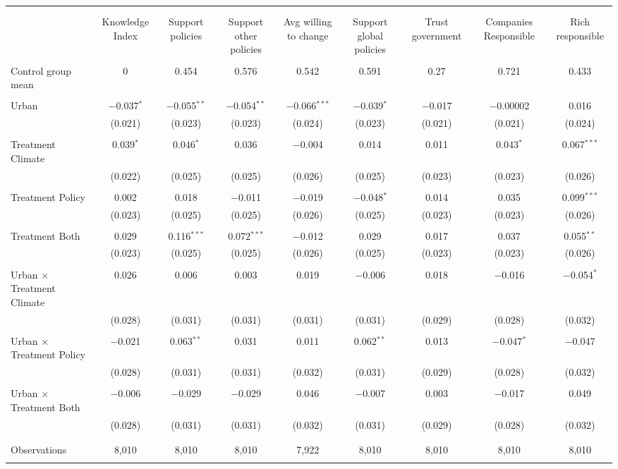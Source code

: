 
\begin{tabular}{@{\extracolsep{5pt}}lcccccccc} 
\\[-1.8ex]\hline 
\hline \\[-1.8ex] 
\\[-1.8ex] & Knowledge Index & Support policies & Support other policies & Avg willing to change & Support global policies & Trust government & Companies Responsible & Rich responsible \\ 
\hline \\[-1.8ex] 
 Control group mean & 0 & 0.454 & 0.576 & 0.542 & 0.591 & 0.27 & 0.721 & 0.433  \\ \hline \\[-1.8ex] Urban & $-$0.037$^{*}$ & $-$0.055$^{**}$ & $-$0.054$^{**}$ & $-$0.066$^{***}$ & $-$0.039$^{*}$ & $-$0.017 & $-$0.00002 & 0.016 \\ 
  & (0.021) & (0.023) & (0.023) & (0.024) & (0.023) & (0.021) & (0.021) & (0.024) \\ 
  & & & & & & & & \\ 
 Treatment Climate & 0.039$^{*}$ & 0.046$^{*}$ & 0.036 & $-$0.004 & 0.014 & 0.011 & 0.043$^{*}$ & 0.067$^{***}$ \\ 
  & (0.022) & (0.025) & (0.025) & (0.026) & (0.025) & (0.023) & (0.023) & (0.026) \\ 
  & & & & & & & & \\ 
 Treatment Policy & 0.002 & 0.018 & $-$0.011 & $-$0.019 & $-$0.048$^{*}$ & 0.014 & 0.035 & 0.099$^{***}$ \\ 
  & (0.023) & (0.025) & (0.025) & (0.026) & (0.025) & (0.023) & (0.023) & (0.026) \\ 
  & & & & & & & & \\ 
 Treatment Both & 0.029 & 0.116$^{***}$ & 0.072$^{***}$ & $-$0.012 & 0.029 & 0.017 & 0.037 & 0.055$^{**}$ \\ 
  & (0.023) & (0.025) & (0.025) & (0.026) & (0.025) & (0.023) & (0.023) & (0.026) \\ 
  & & & & & & & & \\ 
 Urban $\times$ Treatment Climate & 0.026 & 0.006 & 0.003 & 0.019 & $-$0.006 & 0.018 & $-$0.016 & $-$0.054$^{*}$ \\ 
  & (0.028) & (0.031) & (0.031) & (0.031) & (0.031) & (0.029) & (0.028) & (0.032) \\ 
  & & & & & & & & \\ 
 Urban $\times$ Treatment Policy & $-$0.021 & 0.063$^{**}$ & 0.031 & 0.011 & 0.062$^{**}$ & 0.013 & $-$0.047$^{*}$ & $-$0.047 \\ 
  & (0.028) & (0.031) & (0.031) & (0.032) & (0.031) & (0.029) & (0.028) & (0.032) \\ 
  & & & & & & & & \\ 
 Urban $\times$ Treatment Both & $-$0.006 & $-$0.029 & $-$0.029 & 0.046 & $-$0.007 & 0.003 & $-$0.017 & 0.049 \\ 
  & (0.028) & (0.031) & (0.031) & (0.032) & (0.031) & (0.029) & (0.028) & (0.032) \\ 
  & & & & & & & & \\ 
\hline \\[-1.8ex] 

Observations & 8,010 & 8,010 & 8,010 & 7,922 & 8,010 & 8,010 & 8,010 & 8,010 \\ 
\hline 
\hline \\[-1.8ex] 
\end{tabular} 